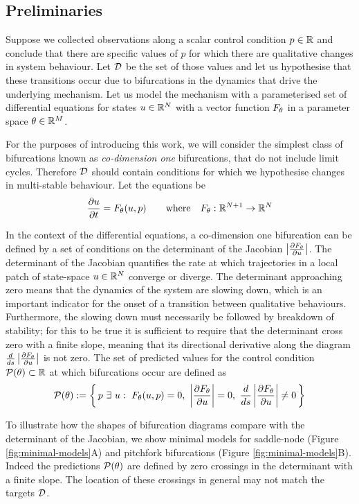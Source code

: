 \subsection{Preliminaries}

Suppose we collected observations along a scalar control condition $p\in\mathbb{R}$ and conclude that there are specific values of $p$ for which there are qualitative changes in system behaviour. Let $\mathcal{D}$ be the set of those values and let us hypothesise that these transitions occur due to bifurcations in the dynamics that drive the underlying mechanism. Let us model the mechanism with a parameterised set of differential equations for states $u\in\mathbb{R}^N$ with a vector function $F_{\theta}$ in a parameter space $\theta\in\mathbb{R}^M$.

For the purposes of introducing this work, we will consider the simplest class of bifurcations known as \textit{co-dimension one} bifurcations, that do not include limit cycles. Therefore $\mathcal{D}$ should contain conditions for which we hypothesise changes in multi-stable behaviour. Let the equations be
\begin{align}
	\frac{\partial u}{\partial t}=F_{\theta}(u,p)
	\qquad\mathrm{where}\quad
	F_{\theta} : \mathbb{R}^{N+1}\rightarrow\mathbb{R}^N
	\label{eq:model}
\end{align}

In the context of the differential equations, a co-dimension one bifurcation can be defined by a set of conditions on the determinant of the Jacobian $\left| \frac{\partial F_{\theta}}{\partial u} \right|$. The determinant of the Jacobian quantifies the rate at which trajectories in a local patch of state-space $u\in\mathbb{R}^N$ converge or diverge. The determinant approaching zero means that the dynamics of the system are slowing down, which is an important indicator for the onset of a transition between qualitative behaviours. Furthermore, the slowing down must necessarily be followed by breakdown of stability; for this to be true it is sufficient to require that the determinant cross zero with a finite slope, meaning that its directional derivative along the diagram $\frac{d}{ds}\left| \frac{\partial F_{\theta}}{\partial u} \right|$ is not zero. The set of predicted values for the control condition $\mathcal{P}(\theta)\subset\mathbb{R}$ at which bifurcations occur are defined as
\begin{align}
	\mathcal{P}(\theta):=\left\{\,
	p\,\,\exists\,\,u:\,\,F_{\theta}(u,p)=0,\,\,\left| \frac{\partial F_{\theta}}{\partial u} \right|=0,
	\,\, \frac{d}{ds}\left| \frac{\partial F_{\theta}}{\partial u} \right|\neq0
	\,\right\}
	\label{eq:predictions}
\end{align}

To illustrate how the shapes of bifurcation diagrams compare with the determinant of the Jacobian, we show minimal models for saddle-node (Figure \ref{fig:minimal-models}A) and pitchfork bifurcations (Figure \ref{fig:minimal-models}B). Indeed the predictions $\mathcal{P}(\theta)$ are defined by zero crossings in the determinant with a finite slope. The location of these crossings in general may not match the targets $\mathcal{D}$.


